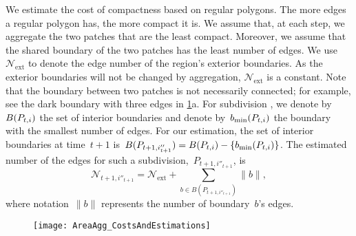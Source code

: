 \documentclass[acmsmall,natbib=false]{acmart}
\begin{document}
We estimate the cost of compactness based on regular polygons.
The more edges a regular polygon has, the more compact it is.
We assume that, at each step, 
we aggregate the two patches that are the least compact.
Moreover, we assume that the shared boundary of the two patches  
has the least number of edges.
We use $\mathcal{N}_\mathrm{ext}$ to 
denote the edge number of the region's exterior boundaries.
As the exterior boundaries will not be changed by aggregation, 
$\mathcal{N}_\mathrm{ext}$ 
is a constant. 
%
Note that the boundary between two patches 
is not necessarily connected; 
for example, see the dark boundary with three edges 
in \fig\ref{fig:AreaAgg_h_comp}a.
For subdivision \Pnode,
we denote by~$B(P_{t,i})$ the set of interior boundaries 
and denote by~$b_\mathrm{min}(P_{t,i})$ 
the boundary with the smallest number of edges.
For our estimation, the set of interior boundaries 
at time~$t+1$ 
is~$B(P_{t+1,i''_{t+1}})= B(P_{t,i})-{\{b_\mathrm{min}(P_{t,i})\}}$. 
The estimated number of the edges for 
such a subdivision,~$P_{t+1,i''_{t+1}}$, is
\begin{equation}
\label{eq:LeftEdgeNum}
\mathcal{N}_{t+1,i''_{t+1}}=
\mathcal{N}_\mathrm{ext} + \sum_{b \in B(P_{t+1,i''_{t+1}})} \|b\|,
\end{equation}
where notation~$\|b\|$ represents the number of boundary~$b$'s edges.

\begin{figure*}[tb]
\centering
\texttt{[image: AreaAgg\_CostsAndEstimations]}
\label{fig:AreaAgg_h_comp}
\end{figure*}
\end{document}
